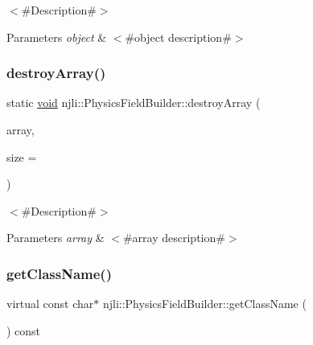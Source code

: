 $<$\#\+Description\#$>$


\begin{DoxyParams}{Parameters}
{\em object} & $<$\#object description\#$>$ \\
\hline
\end{DoxyParams}
\mbox{\label{classnjli_1_1_physics_field_builder_a706cc8a4651003410842cc201731cf1f}} 
\subsubsection{\texorpdfstring{destroy\+Array()}{destroyArray()}}
{\footnotesize\ttfamily static \mbox{\hyperlink{_thread_8h_af1e856da2e658414cb2456cb6f7ebc66}{void}} njli\+::\+Physics\+Field\+Builder\+::destroy\+Array (\begin{DoxyParamCaption}\item[{\mbox{\hyperlink{classnjli_1_1_physics_field_builder}{Physics\+Field\+Builder}} $\ast$$\ast$}]{array,  }\item[{const \mbox{\hyperlink{_util_8h_a10e94b422ef0c20dcdec20d31a1f5049}{u32}}}]{size = {} }\end{DoxyParamCaption})\hspace{0.3cm}{\ttfamily [static]}}

$<$\#\+Description\#$>$


\begin{DoxyParams}{Parameters}
{\em array} & $<$\#array description\#$>$ \\
\hline
\end{DoxyParams}
\mbox{\label{classnjli_1_1_physics_field_builder_ab9d6b3a93b3e8e05ae0cdf325c2d29f5}} 
\subsubsection{\texorpdfstring{get\+Class\+Name()}{getClassName()}}
{\footnotesize\ttfamily virtual const char$\ast$ njli\+::\+Physics\+Field\+Builder\+::get\+Class\+Name (\begin{DoxyParamCaption}{ }\end{DoxyParamCaption}) const\hspace{0.3cm}{\ttfamily [virtual]}}

